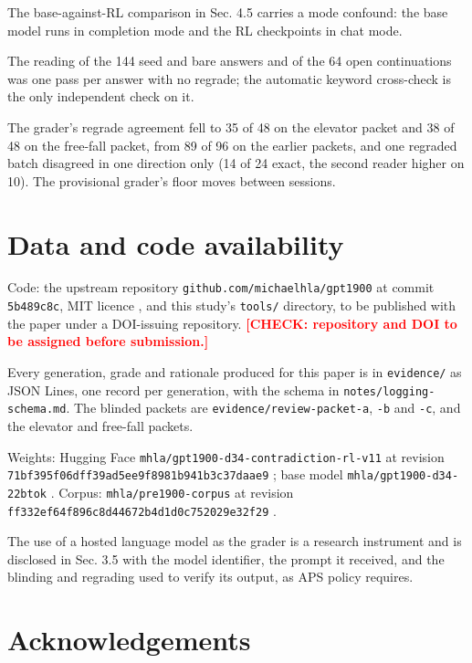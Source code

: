 \documentclass[reprint,prx,amsmath,amssymb,aps,superscriptaddress]{revtex4-2}
\begin{document}
The base-against-RL comparison in Sec. 4.5 carries a mode confound: the base model runs in completion mode and the RL checkpoints in chat mode.

The reading of the 144 seed and bare answers and of the 64 open continuations was one pass per answer with no regrade; the automatic keyword cross-check is the only independent check on it.

The grader's regrade agreement fell to 35 of 48 on the elevator packet and 38 of 48 on the free-fall packet, from 89 of 96 on the earlier packets, and one regraded batch disagreed in one direction only (14 of 24 exact, the second reader higher on 10). The provisional grader's floor moves between sessions.

\section{Data and code availability}

Code: the upstream repository \texttt{github.com/michaelhla/gpt1900} at commit \texttt{5b489c8c}, MIT licence \cite{ref1}, and this study's \texttt{tools/} directory, to be published with the paper under a DOI-issuing repository. \textbf{\textcolor{red}{[CHECK: repository and DOI to be assigned before submission.]}}

Every generation, grade and rationale produced for this paper is in \texttt{evidence/} as JSON Lines, one record per generation, with the schema in \texttt{notes/logging-schema.md}. The blinded packets are \texttt{evidence/review-packet-a}, \texttt{-b} and \texttt{-c}, and the elevator and free-fall packets.

Weights: Hugging Face \texttt{mhla/gpt1900-d34-contradiction-rl-v11} at revision \texttt{71bf395f06dff39ad5ee9f8981b941b3c37daae9} \cite{ref14}; base model \texttt{mhla/gpt1900-d34-22btok} \cite{ref15}. Corpus: \texttt{mhla/pre1900-corpus} at revision \texttt{ff332ef64f896c8d44672b4d1d0c752029e32f29} \cite{ref16}.

The use of a hosted language model as the grader is a research instrument and is disclosed in Sec. 3.5 with the model identifier, the prompt it received, and the blinding and regrading used to verify its output, as APS policy requires.

\section{Acknowledgements}
\end{document}
